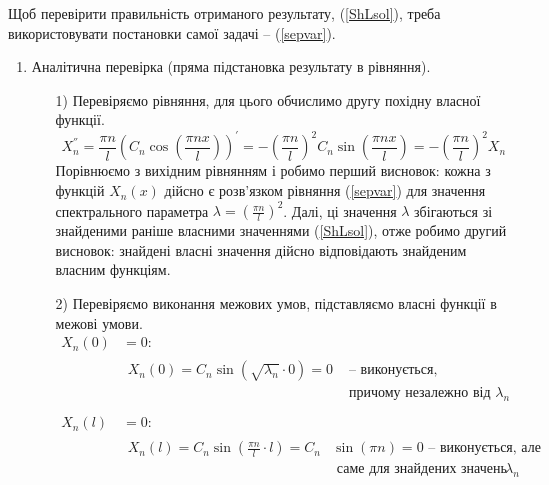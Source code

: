 \documentclass[a4paper, 14pt]{extreport}
\begin{document}
\noindent Щоб перевірити правильність отриманого результату, (\ref{ShLsol}), треба використовувати постановки самої задачі -- (\ref{sepvar}). 
\begin{enumerate}
    \item Аналітична перевірка (пряма підстановка результату в рівняння).
    \begin{enumerate}
        \item[1)] Перевіряємо рівняння, для цього обчислимо другу похідну власної функції. 
        \begin{equation*}
            X_n^{''} = \frac{\pi n}{l} \left(C_n\cos\left(\frac{\pi n x}{l}\right)\right)^{'} = -\left(\frac{\pi n}{l}\right)^2 C_n\sin\left(\frac{\pi n x}{l}\right) = -\left(\frac{\pi n}{l}\right)^2 X_n
        \end{equation*}
        Порівнюємо з вихідним рівнянням і робимо перший висновок: кожна з функцій $X_n(x)$ дійсно є розв’язком рівняння (\ref{sepvar}) для значення спектрального параметра $\lambda = \left(\frac{\pi n}{l}\right)^2$. Далі, ці значення $\lambda$ збігаються зі знайденими раніше власними значеннями (\ref{ShLsol}), отже робимо другий висновок: знайдені власні значення дійсно відповідають знайденим власним функціям.
        \item[2)] Перевіряємо виконання межових умов, підставляємо власні функції в межові умови.
        \begin{equation*}
            \begin{aligned}
                X_n(0) &=  0:\\
                &\begin{aligned}
                    X_n(0) = C_n \sin(\sqrt{\lambda_n} \cdot 0) = 0 &\text{ -- виконується,}\\
                    &\text{ причому незалежно від }\lambda_n
                \end{aligned}\\
                \\
                X_n(l) &= 0:\\
                &\begin{aligned}
                    X_n(l) = C_n \sin\left(\frac{\pi n}{l} \cdot l\right) = C_n &\sin(\pi n) = 0 \text{ -- виконується,  але}\\
                    &\text{ саме для знайдених значень }\lambda_n
                \end{aligned}\\
            \end{aligned}
        \end{equation*}

\end{enumerate}
\end{enumerate}
\end{document}
